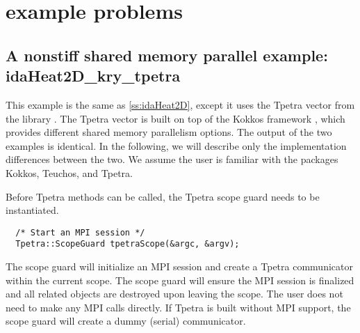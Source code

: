 \section{{\trilinos} example problems}\label{s:ex_trilinos}

\subsection{A nonstiff shared memory parallel example:  idaHeat2D\_kry\_tpetra}
\label{ss:idaHeat2D_kry_tpetra}

This example is the same as \ref{ss:idaHeat2D}, except it uses the
Tpetra \cite{hoemmen2015tpetra} vector from the {\trilinos} library \cite{Trilinos-Overview}. The Tpetra vector is built on top of the Kokkos
framework \cite{edwards2014kokkos}, which provides different shared memory parallelism options. The output of the
two examples is identical. In the following, we will describe only the implementation
differences between the two. We assume the user is familiar with the {\trilinos} packages
Kokkos, Teuchos, and Tpetra.

Before Tpetra methods can be called, the Tpetra scope guard needs to be instantiated. 
\begin{verbatim}
  /* Start an MPI session */
  Tpetra::ScopeGuard tpetraScope(&argc, &argv);
\end{verbatim}
The scope guard will initialize an MPI session and create a Tpetra communicator
within the current scope. The scope guard will ensure the MPI session is finalized
and all related objects are destroyed upon leaving the scope. The user does not need
to make any MPI calls directly. 
If Tpetra is built without MPI support, the scope guard will create a dummy
(serial) communicator.


